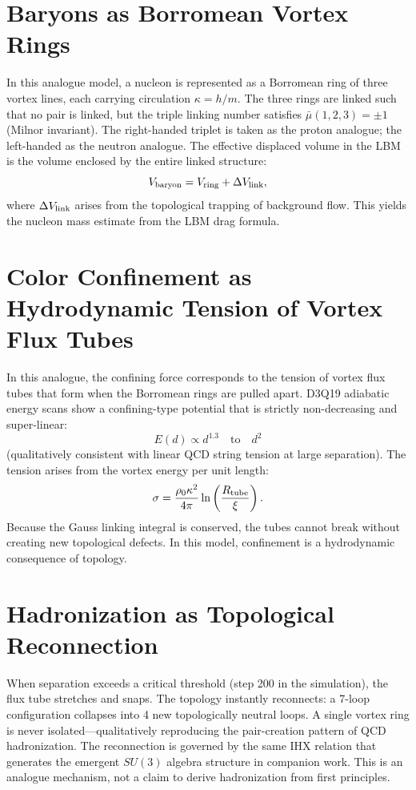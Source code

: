 \documentclass[reprint,amsmath,amssymb,aps,prl,superscriptaddress]{revtex4-2}
\begin{document}
\section{Baryons as Borromean Vortex Rings}
\label{sec:baryons}

In this analogue model, a nucleon is represented as a Borromean ring of three vortex lines, each carrying circulation $\kappa=h/m$. The three rings are linked such that no pair is linked, but the triple linking number satisfies $\bar{\mu}(1,2,3)=\pm1$ (Milnor invariant). The right-handed triplet is taken as the proton analogue; the left-handed as the neutron analogue. The effective displaced volume in the LBM is the volume enclosed by the entire linked structure:
\[
V_{\rm baryon}=V_{\rm ring}+\Delta V_{\rm link},
\]
where $\Delta V_{\rm link}$ arises from the topological trapping of background flow. This yields the nucleon mass estimate from the LBM drag formula.

\section{Color Confinement as Hydrodynamic Tension of Vortex Flux Tubes}
\label{sec:confinement}

In this analogue, the confining force corresponds to the tension of vortex flux tubes that form when the Borromean rings are pulled apart. D3Q19 adiabatic energy scans show a confining-type potential that is strictly non-decreasing and super-linear:
\[
E(d)\propto d^{1.3}\quad\text{to}\quad d^2
\]
(qualitatively consistent with linear QCD string tension at large separation). The tension arises from the vortex energy per unit length:
\[
\sigma=\frac{\rho_0\kappa^2}{4\pi}\ln\left(\frac{R_{\rm tube}}{\xi}\right).
\]
Because the Gauss linking integral is conserved, the tubes cannot break without creating new topological defects. In this model, confinement is a hydrodynamic consequence of topology.

\section{Hadronization as Topological Reconnection}
\label{sec:hadronization}

When separation exceeds a critical threshold (step 200 in the simulation), the flux tube stretches and snaps. The topology instantly reconnects: a 7-loop configuration collapses into 4 new topologically neutral loops. A single vortex ring is never isolated---qualitatively reproducing the pair-creation pattern of QCD hadronization. The reconnection is governed by the same IHX relation that generates the emergent $SU(3)$ algebra structure in companion work. This is an analogue mechanism, not a claim to derive hadronization from first principles.
\end{document}
